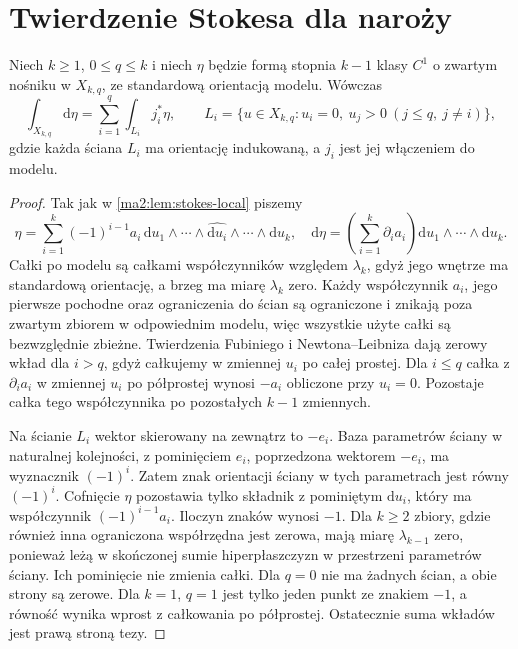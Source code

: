 \section{Twierdzenie Stokesa dla naroży}

\begin{lemat}
\label{ma2:lem:stokes-orthant}
Niech $k\ge1$, $0\le q\le k$ i niech $\eta$ będzie
formą stopnia $k-1$ klasy $C^1$ o zwartym nośniku w $X_{k,q}$,
ze standardową orientacją modelu.
Wówczas
\[
 \int_{X_{k,q}}\mathrm d\eta
 =\sum_{i=1}^q\int_{L_i}j_i^*\eta,
 \qquad
 L_i=\{u\in X_{k,q}:u_i=0,\
                    u_j>0\ (j\le q,\ j\ne i)\},
\]
gdzie każda ściana $L_i$ ma orientację indukowaną,
a $j_i$ jest jej włączeniem do modelu.
\end{lemat}
\begin{proof}
Tak jak w \ref{ma2:lem:stokes-local}
piszemy
\[
 \eta=\sum_{i=1}^k(-1)^{i-1}a_i\,
 \mathrm du_1\wedge\cdots\wedge
 \widehat{\mathrm du_i}\wedge\cdots\wedge\mathrm du_k,
 \quad
 \mathrm d\eta=\left(\sum_{i=1}^k\partial_i a_i\right)
 \mathrm du_1\wedge\cdots\wedge\mathrm du_k.
\]
Całki po modelu są całkami współczynników
względem $\lambda_k$, gdyż jego wnętrze
ma standardową orientację, a brzeg ma miarę
$\lambda_k$ zero.
Każdy współczynnik $a_i$, jego pierwsze
pochodne oraz ograniczenia do ścian są
ograniczone i znikają poza zwartym zbiorem
w odpowiednim modelu, więc wszystkie użyte
całki są bezwzględnie zbieżne.
Twierdzenia Fubiniego i Newtona--Leibniza
dają zerowy wkład dla $i>q$, gdyż całkujemy
w zmiennej $u_i$ po całej prostej.
Dla $i\le q$ całka z $\partial_i a_i$
w zmiennej $u_i$ po półprostej wynosi
$-a_i$ obliczone przy $u_i=0$.
Pozostaje całka tego współczynnika
po pozostałych $k-1$ zmiennych.

Na ścianie $L_i$ wektor skierowany na zewnątrz
to $-e_i$. Baza parametrów ściany w naturalnej
kolejności, z pominięciem $e_i$, poprzedzona
wektorem $-e_i$, ma wyznacznik $(-1)^i$.
Zatem znak orientacji ściany w tych parametrach
jest równy $(-1)^i$. Cofnięcie $\eta$ pozostawia
tylko składnik z pominiętym $\mathrm du_i$,
który ma współczynnik $(-1)^{i-1}a_i$.
Iloczyn znaków wynosi $-1$.
Dla $k\ge2$ zbiory, gdzie również inna
ograniczona współrzędna jest zerowa, mają
miarę $\lambda_{k-1}$ zero, ponieważ leżą
w skończonej sumie hiperpłaszczyzn
w przestrzeni parametrów ściany.
Ich pominięcie nie zmienia całki.
Dla $q=0$ nie ma żadnych ścian, a obie strony
są zerowe. Dla $k=1$, $q=1$
jest tylko jeden punkt ze znakiem $-1$,
a równość wynika wprost z całkowania po półprostej.
Ostatecznie suma wkładów jest prawą stroną tezy.
\end{proof}

